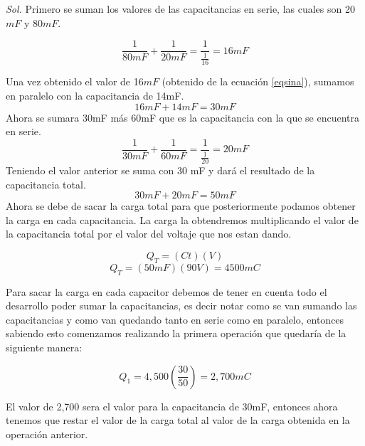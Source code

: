 \begin{enumerate}
	      \textit{Sol. }
	      Primero se suman los valores de las capacitancias en serie, las cuales son 20$mF$ y 80$mF$.

	      \begin{equation}
		      \label{eqsina}
		      \frac{1}{80mF}+\frac{1}{20mF}=\frac{1}{\frac{1}{16}}=16mF
	      \end{equation}

	      Una vez obtenido el valor de 16$mF$ (obtenido de la ecuación \eqref{eqsina}), sumamos en paralelo con la capacitancia de 14mF.
	      \begin{equation}
		      16mF+14mF=30mF
	      \end{equation}
	      Ahora se sumara 30mF más 60mF que es la capacitancia con la que se encuentra en serie.
	      \begin{equation}
		      \frac{1}{30mF}+\frac{1}{60mF}=\frac{1}{\frac{1}{20}}=20mF
	      \end{equation}
	      Teniendo el valor anterior se suma con 30 mF y dará el resultado de la capacitancia total.
	      \begin{equation}
		      30mF+20mF=50 mF
	      \end{equation}
	      Ahora se debe de sacar la carga total para que posteriormente podamos obtener la carga en cada capacitancia.
	      La carga la obtendremos multiplicando el valor de la capacitancia total por el valor del voltaje que nos estan dando.

	      \begin{equation}
		      Q_{T}=(Ct)(V)
	      \end{equation}
	      \begin{equation}
		      Q_T=(50mF)(90V)=4500mC
	      \end{equation}

	      Para sacar la carga en cada capacitor debemos de tener en cuenta todo el desarrollo poder sumar la capacitancias, es decir notar como se van sumando las capacitancias y como van quedando tanto en serie como en paralelo, entonces sabiendo esto comenzamos realizando la primera operación que quedaría de la siguiente manera:

	      \begin{equation*}
		      Q_1=4,500\left(\frac{30}{50}\right)=2,700mC
	      \end{equation*}

	      El valor de 2,700 sera el valor para la capacitancia de 30mF, entonces ahora tenemos que restar el valor de la carga total al valor de la carga obtenida en la operación anterior.


\end{enumerate}
